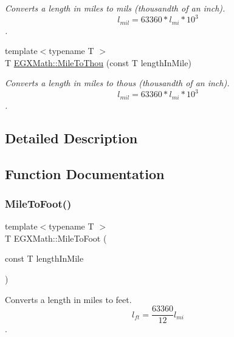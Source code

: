 \begin{DoxyCompactItemize}
\begin{DoxyCompactList}\small\item\em Converts a length in miles to mils (thousandth of an inch). \[ l_{mil}=63360 * l_{mi} * 10^{3} \]. \end{DoxyCompactList}\item 
{\footnotesize template$<$typename T $>$ }\\T \mbox{\hyperlink{group___e_g_x_math-_conversions-_length_conversions-_imperial-_mile-_imperial_gac5c37e3054c9b7817c9df5a348f8faf7}{E\+G\+X\+Math\+::\+Mile\+To\+Thou}} (const T length\+In\+Mile)
\begin{DoxyCompactList}\small\item\em Converts a length in miles to thous (thousandth of an inch). \[ l_{mil}=63360 * l_{mi} * 10^{3} \]. \end{DoxyCompactList}\end{DoxyCompactItemize}


\subsection{Detailed Description}


\subsection{Function Documentation}
\mbox{\label{group___e_g_x_math-_conversions-_length_conversions-_imperial-_mile-_imperial_gafdc7f1f7887e48f18cb0d324b719a677}} 
\subsubsection{\texorpdfstring{Mile\+To\+Foot()}{MileToFoot()}}
{\footnotesize\ttfamily template$<$typename T $>$ \\
T E\+G\+X\+Math\+::\+Mile\+To\+Foot (\begin{DoxyParamCaption}\item[{const T}]{length\+In\+Mile }\end{DoxyParamCaption})}



Converts a length in miles to feet. \[ l_{ft}= \frac{63360}{12} l_{mi} \]. 

